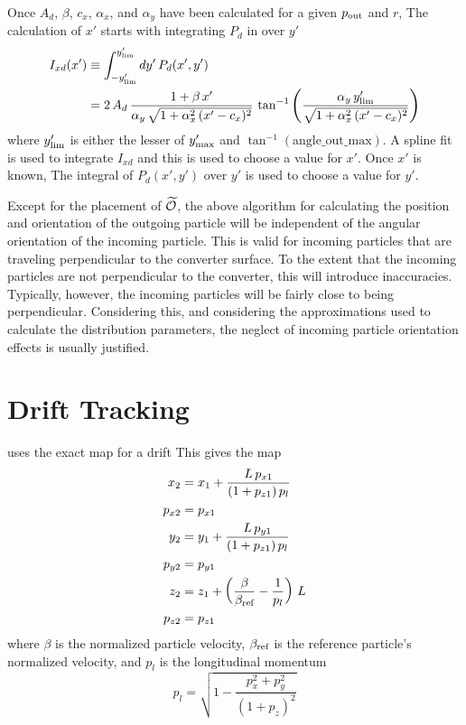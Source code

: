 Once $A_d$, $\beta$, $c_x$, $\alpha_x$, and $\alpha_y$ have been calculated for a given $p_{\text{out}}$ and
$r$, The calculation of $x'$ starts with integrating $P_d$ in  over $y'$
\begin{align} 
  I_{xd} (x') &\equiv \int_{-y'_{\text{lim}}}^{y'_{\text{lim}}} dy' \, P_d(x', y')
  \label{ixdyp} \\
  &= 2 \, A_d \, \frac{1 + \beta \, x'}{\alpha_y \, \sqrt{1 + \alpha_x^2 \, (x' - c_x)^2 }} \,
  \tan^{-1} \left( \frac{\alpha_y \, y'_{\text{lim}}}{\sqrt{1 + \alpha_x^2 \, (x' - c_x)^2}} \right)
  \nonumber
\end{align}
where $y'_{\text{lim}}$ is either the lesser of $y'_{\text{max}}$ and $\tan^{-1}(\text{angle_out_max})$.
A spline fit is used to integrate $I_{xd}$ and this is used to choose a value for $x'$. Once $x'$
is known, The integral of $P_d(x', y')$ over $y'$ is used to choose a value for $y'$.

Except for the placement of $\widetilde{{\cal O}}$, the above algorithm for calculating the position and
orientation of the outgoing particle will be independent of the angular orientation of the incoming
particle. This is valid for incoming particles that are traveling perpendicular to the converter
surface. To the extent that the incoming particles are not perpendicular to the converter, this will
introduce inaccuracies. Typically, however, the incoming particles will be fairly close to being
perpendicular. Considering this, and considering the approximations used to calculate the
distribution parameters, the neglect of incoming particle orientation effects is usually justified.

\section{Drift Tracking}
\label{s:drift.std}

\bmad uses the exact map for a drift
This gives the map
\begin{align}
  x_2    &= x_1 + \frac{L \, p_{x1}}{(1 + p_{z1}) \, p_l} \nonumber \\
  p_{x2} &= p_{x1}  \nonumber \\
  y_2    &= y_1 + \frac{L \, p_{y1}}{(1 + p_{z1}) \, p_l} \nonumber \\
  p_{y2} &= p_{y1}  \\
  z_2    &= z_1 + \left( \frac{\beta}{\beta_{\text{ref}}} - \frac{1}{p_l} \right) \, L \nonumber \\
  p_{z2} &= p_{z1} \nonumber
\end{align}
where $\beta$ is the normalized particle velocity, $\beta_{\text{ref}}$ is 
the reference particle's normalized velocity, and $p_l$ is the
longitudinal momentum
\begin{equation}
  p_l = \sqrt{1 - \frac{p_x^2 + p_y^2}{(1 + p_z)^2}}
\end{equation}

